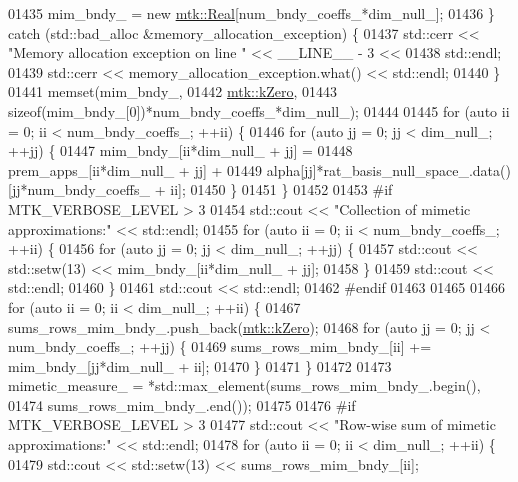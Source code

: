 \begin{DoxyCode}
{{01435     mim\_bndy\_ = \textcolor{keyword}{new} \hyperlink{group__c01-roots_gac080bbbf5cbb5502c9f00405f894857d}{mtk::Real}[num\_bndy\_coeffs\_*dim\_null\_];
01436   \} \textcolor{keywordflow}{catch} (std::bad\_alloc &memory\_allocation\_exception) \{
01437     std::cerr << \textcolor{stringliteral}{"Memory allocation exception on line "} << \_\_LINE\_\_ - 3 <<
01438       std::endl;
01439     std::cerr << memory\_allocation\_exception.what() << std::endl;
01440   \}
01441   memset(mim\_bndy\_,
01442          \hyperlink{group__c01-roots_ga59a451a5fae30d59649bcda274fea271}{mtk::kZero},
01443          \textcolor{keyword}{sizeof}(mim\_bndy\_[0])*num\_bndy\_coeffs\_*dim\_null\_);
01444 
01445   \textcolor{keywordflow}{for} (\textcolor{keyword}{auto} ii = 0; ii < num\_bndy\_coeffs\_; ++ii) \{
01446     \textcolor{keywordflow}{for} (\textcolor{keyword}{auto} jj = 0; jj < dim\_null\_; ++jj) \{
01447       mim\_bndy\_[ii*dim\_null\_ + jj] =
01448         prem\_apps\_[ii*dim\_null\_ + jj] +
01449         alpha[jj]*rat\_basis\_null\_space\_.data()[jj*num\_bndy\_coeffs\_ + ii];
01450     \}
01451   \}
01452 
01453 \textcolor{preprocessor}{  #if MTK\_VERBOSE\_LEVEL > 3}
01454   std::cout << \textcolor{stringliteral}{"Collection of mimetic approximations:"} << std::endl;
01455   \textcolor{keywordflow}{for} (\textcolor{keyword}{auto} ii = 0; ii < num\_bndy\_coeffs\_; ++ii) \{
01456     \textcolor{keywordflow}{for} (\textcolor{keyword}{auto} jj = 0; jj < dim\_null\_; ++jj) \{
01457       std::cout << std::setw(13) << mim\_bndy\_[ii*dim\_null\_ + jj];
01458     \}
01459     std::cout << std::endl;
01460   \}
01461   std::cout << std::endl;
01462 \textcolor{preprocessor}{  #endif}
01463 
01465 
01466   \textcolor{keywordflow}{for} (\textcolor{keyword}{auto} ii = 0; ii < dim\_null\_; ++ii) \{
01467     sums\_rows\_mim\_bndy\_.push\_back(\hyperlink{group__c01-roots_ga59a451a5fae30d59649bcda274fea271}{mtk::kZero});
01468     \textcolor{keywordflow}{for} (\textcolor{keyword}{auto} jj = 0; jj < num\_bndy\_coeffs\_; ++jj) \{
01469       sums\_rows\_mim\_bndy\_[ii] += mim\_bndy\_[jj*dim\_null\_ + ii];
01470     \}
01471   \}
01472 
01473     mimetic\_measure\_ = *std::max\_element(sums\_rows\_mim\_bndy\_.begin(),
01474                                       sums\_rows\_mim\_bndy\_.end());
01475 
01476 \textcolor{preprocessor}{  #if MTK\_VERBOSE\_LEVEL > 3}
01477   std::cout << \textcolor{stringliteral}{"Row-wise sum of mimetic approximations:"} << std::endl;
01478   \textcolor{keywordflow}{for} (\textcolor{keyword}{auto} ii = 0; ii < dim\_null\_; ++ii) \{
01479     std::cout << std::setw(13) << sums\_rows\_mim\_bndy\_[ii];
}}
\end{DoxyCode}
